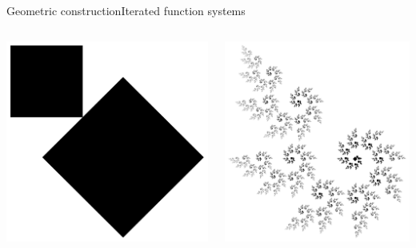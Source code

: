 \documentclass[xcolor=x11names,compress,professionalfonts]{beamer}
\renewcommand{\(}{\begin{columns}}
\renewcommand{\)}{\end{columns}}
\newcommand{\<}[1]{\begin{column}{#1}}
\renewcommand{\>}{\end{column}}
\begin{document}
\begin{frame}{Geometric construction}{Iterated function systems}

\begin{columns}
\newcommand{\s}{.2}

  \begin{column}{1.5cm}
  \centering
    \includegraphics[scale=0.04]{leaf1.png}
  \end{column}

  \begin{column}{3cm}
  \centering
    \includegraphics[scale=0.08]{leaf.png}
  \end{column}


\end{columns}
\end{frame}
\end{document}
